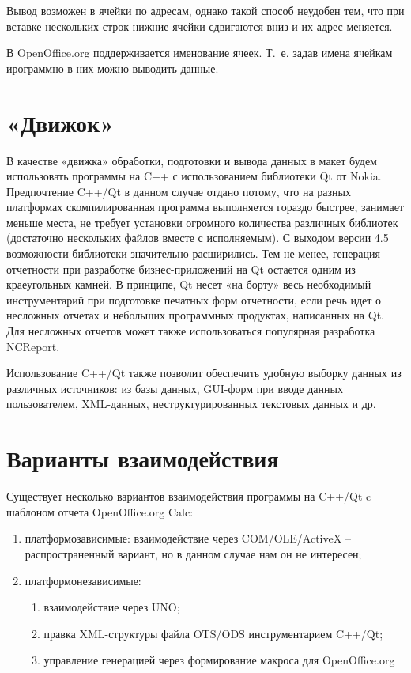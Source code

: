 \documentclass[10pt, a5paper]{article}
\begin{document}
Вывод возможен в ячейки по адресам, однако такой способ неудобен тем, что при вставке нескольких строк нижние ячейки сдвигаются вниз и их адрес меняется.

В OpenOffice.org поддерживается именование ячеек. Т. е. задав имена ячейкам ирограммно в них можно выводить данные.

\section*{«Движок»}
В качестве «движка» обработки, подготовки и вывода данных в макет будем использовать программы на C++ с использованием библиотеки Qt от Nokia. Предпочтение C++/Qt в данном случае отдано потому, что на разных платформах скомпилированная программа выполняется гораздо быстрее, занимает меньше места, не требует установки огромного количества различных библиотек (достаточно нескольких файлов вместе с исполняемым).
С выходом версии 4.5 возможности библиотеки значительно расширились. Тем не менее, генерация отчетности при разработке бизнес-приложений на Qt остается одним из краеугольных камней. В принципе, Qt несет «на борту» весь необходимый инструментарий при подготовке печатных форм отчетности, если речь идет о несложных отчетах и небольших программных продуктах, написанных на Qt. Для несложных отчетов может также использоваться популярная разработка NCReport.

Использование C++/Qt также позволит обеспечить удобную выборку данных из различных источников: из базы данных, GUI-форм при вводе данных пользователем, XML-данных, неструктурированных текстовых данных и др.

\section*{Варианты взаимодействия}

Существует несколько вариантов взаимодействия программы на C++/Qt c шаблоном отчета OpenOffice.org Calc:

\begin{enumerate}
\item платформозависимые: взаимодействие через COM/OLE/ActiveX – распространенный вариант, но в данном случае нам он не интересен;
\item платформонезависимые:
\begin{enumerate} 
\item взаимодействие через UNO;
\item правка XML-структуры файла OTS/ODS инструментарием C++/Qt;
\item управление генерацией через формирование макроса для OpenOffice.org
\end{enumerate}
\end{enumerate}
\end{document}
